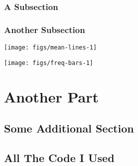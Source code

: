 \documentclass[
    numbers=noenddot,
    open=any,
    paper=a4,
    oneside,
    pagesize,
    captions=tableheading,
    bibliography=totoc,
    11pt
    ]{scrbook}
\begin{document}
\hypertarget{a-subsection}{%
\section{A Subsection}\label{a-subsection}}

\hypertarget{another-subsection}{%
\section{Another Subsection}\label{another-subsection}}

\begin{center}\texttt{[image: figs/mean-lines-1]} \end{center}

\begin{center}\texttt{[image: figs/freq-bars-1]} \end{center}

\hypertarget{another-part}{%
\part{Another Part}\label{another-part}}

\hypertarget{some-additional-section}{%
\chapter{Some Additional Section}\label{some-additional-section}}

\textcite{tarski1944semantic}

\textcite{dayal2009variation}

\hypertarget{all-the-code-i-used}{%
\chapter*{All The Code I Used}\label{all-the-code-i-used}}
\end{document}
